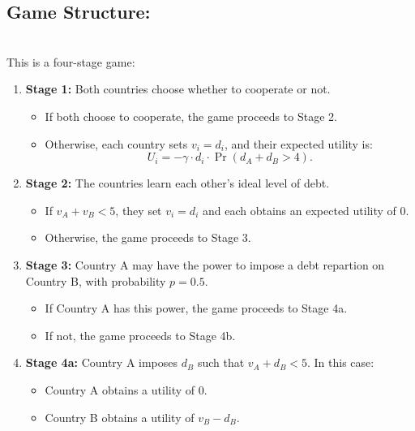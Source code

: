 \documentclass{article}
\begin{document}
\subsection{Game Structure:} \\

This is a four-stage game:

\begin{enumerate}
    \item \textbf{Stage 1:} Both countries choose whether to cooperate or not. 
    \begin{itemize}
        \item If both choose to cooperate, the game proceeds to Stage 2.
        \item Otherwise, each country sets $v_i = d_i$, and their expected utility is:
        \[
        U_i = -\gamma \cdot d_i \cdot \Pr(d_A + d_B > 4).
        \]
    \end{itemize}

    \item \textbf{Stage 2:} The countries learn each other's ideal level of debt.
    \begin{itemize}
        \item If $v_A + v_B < 5$, they set $v_i = d_i$ and each obtains an expected utility of 0.
        \item Otherwise, the game proceeds to Stage 3.
    \end{itemize}

    \item \textbf{Stage 3:} Country A may have the power to impose a debt repartion on Country B, with probability $p = 0.5$.
    \begin{itemize}
        \item If Country A has this power, the game proceeds to Stage 4a.
        \item If not, the game proceeds to Stage 4b.
    \end{itemize}

    \item \textbf{Stage 4a:} Country A imposes $d_B$ such that $v_A + d_B < 5$. In this case:
    \begin{itemize}
        \item Country A obtains a utility of 0.
        \item Country B obtains a utility of $v_B - d_B$.
    \end{itemize}


\end{enumerate}
\end{document}
